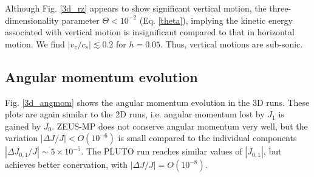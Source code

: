 Although Fig. \ref{3d_rz} appears to show significant vertical motion,
the three-dimensionality parameter $\Theta < 10^{-2}$
(Eq. \ref{theta}), implying the kinetic energy associated with
vertical motion is insignificant compared to that in horizontal
motion. We find  $|v_z/c_s|\lesssim
0.2$ for $h=0.05$. Thus, vertical motions are sub-sonic.  



\subsection{Angular momentum evolution} 
Fig. \ref{3d_angmom} shows the angular momentum evolution in the 3D
runs. These plots are again similar to the 2D runs, i.e. angular
momentum lost by $J_1$ is gained by $J_0$. ZEUS-MP does not conserve
angular momentum very well, but the variation $|\Delta J/J|<
O(10^{-6})$ is small compared 
to the individual components $|\Delta J_{0,1}/J|\sim 
5\times10^{-5}$. The PLUTO run reaches similar values of
$|J_{0,1}|$, but achieves better conervation, with $|\Delta
J/J|=O(10^{-8})$. 

